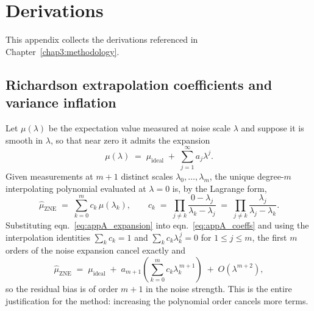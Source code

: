 
\chapter{Derivations}

\label{AppendixA}

This appendix collects the derivations referenced in Chapter~\ref{chap3:methodology}.

\section{Richardson extrapolation coefficients and variance inflation}
\label{sec:appA_richardson}

Let $\mu(\lambda)$ be the expectation value measured at noise scale $\lambda$ and
suppose it is smooth in $\lambda$, so that near zero it admits the expansion
\begin{equation}
    \mu(\lambda) \;=\; \mu_{\text{ideal}} \;+\; \sum_{j=1}^{\infty} a_j \lambda^{j}.
    \label{eq:appA_expansion}
\end{equation}
Given measurements at $m+1$ distinct scales $\lambda_0, \ldots, \lambda_m$, the
unique degree-$m$ interpolating polynomial evaluated at $\lambda = 0$ is, by the
Lagrange form,
\begin{equation}
    \widehat{\mu}_{\text{ZNE}} \;=\; \sum_{k=0}^{m} c_k \, \mu(\lambda_k),
    \qquad
    c_k \;=\; \prod_{j \neq k} \frac{0 - \lambda_j}{\lambda_k - \lambda_j}
    \;=\; \prod_{j \neq k} \frac{\lambda_j}{\lambda_j - \lambda_k}.
    \label{eq:appA_coeffs}
\end{equation}
Substituting eqn.~\eqref{eq:appA_expansion} into eqn.~\eqref{eq:appA_coeffs} and using
the interpolation identities
$\sum_k c_k = 1$ and $\sum_k c_k \lambda_k^{\,j} = 0$ for $1 \leq j \leq m$, the
first $m$ orders of the noise expansion cancel exactly and
\begin{equation}
    \widehat{\mu}_{\text{ZNE}} \;=\; \mu_{\text{ideal}}
    \;+\; a_{m+1} \left( \sum_{k=0}^{m} c_k \lambda_k^{\,m+1} \right)
    \;+\; O(\lambda^{m+2}),
    \label{eq:appA_bias}
\end{equation}
so the residual bias is of order $m+1$ in the noise strength. This is the entire
justification for the method: increasing the polynomial order cancels more terms.

